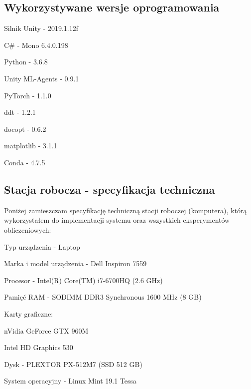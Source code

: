 \subsection{Wykorzystywane wersje oprogramowania}
\begin{enumerate*}
\item Silnik Unity - 2019.1.12f
\item C\# - Mono 6.4.0.198
\item Python - 3.6.8
\item Unity ML-Agents - 0.9.1
\item PyTorch - 1.1.0
\item ddt - 1.2.1
\item docopt - 0.6.2
\item matplotlib - 3.1.1
\item Conda - 4.7.5
\end{enumerate*}

\subsection{Stacja robocza - specyfikacja techniczna}
\label{HardwareSpecs}
Poniżej zamieszczam specyfikację techniczną stacji roboczej (komputera), którą wykorzystałem do implementacji systemu oraz wszystkich eksperymentów obliczeniowych:
\begin{enumerate*}
\item Typ urządzenia - Laptop
\item Marka i model urządzenia - Dell Inspiron 7559
\item Procesor - Intel(R) Core(TM) i7-6700HQ (2.6 GHz)
\item Pamięć RAM - SODIMM DDR3 Synchronous 1600 MHz (8 GB)
\item Karty graficzne:
\begin{itemize*}
\item nVidia GeForce GTX 960M
\item Intel HD Graphics 530
\end{itemize*}
\item Dysk - PLEXTOR PX-512M7 (SSD 512 GB)
\item System operacyjny - Linux Mint 19.1 Tessa
\end{enumerate*}